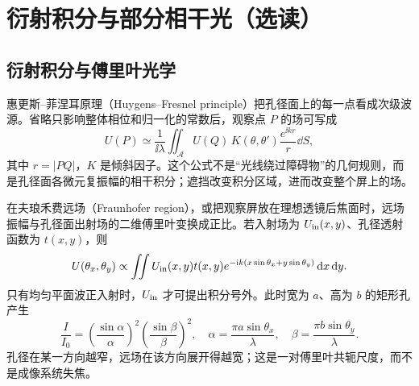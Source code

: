 \section{衍射积分与部分相干光（选读）}

\subsection{衍射积分与傅里叶光学}


惠更斯--菲涅耳原理（Huygens--Fresnel principle）把孔径面上的每一点看成次级波源。省略只影响整体相位和归一化的常数后，观察点 $P$ 的场可写成
\begin{equation}
 U(P)\simeq\frac1{\ii\lambda}\iint_{\mathcal A}
 U(Q)\,K(\theta,\theta')\frac{e^{\ii k r}}r\dd S,
\end{equation}
其中 $r=|PQ|$，$K$ 是倾斜因子。这个公式不是“光线绕过障碍物”的几何规则，而是孔径面各微元复振幅的相干积分；遮挡改变积分区域，进而改变整个屏上的场。

在夫琅禾费远场（Fraunhofer region），或把观察屏放在理想透镜后焦面时，远场振幅与孔径面出射场的二维傅里叶变换成正比。若入射场为 $U_{\rm in}(x,y)$、孔径透射函数为 $t(x,y)$，则
\begin{equation}
 U(\theta_x,\theta_y)\propto
 \iint U_{\rm in}(x,y)t(x,y)e^{-\mathrm i k(x\sin\theta_x+y\sin\theta_y)}\mathop{}\!\mathrm d x\mathop{}\!\mathrm d y.
\end{equation}
只有均匀平面波正入射时，$U_{\rm in}$ 才可提出积分号外。此时宽为 $a$、高为 $b$ 的矩形孔产生
\begin{equation}
 \frac I{I_0}=
 \left(\frac{\sin\alpha}{\alpha}\right)^2
 \left(\frac{\sin\beta}{\beta}\right)^2,
 \quad
 \alpha=\frac{\pi a\sin\theta_x}{\lambda},
 \quad
 \beta=\frac{\pi b\sin\theta_y}{\lambda}.
\end{equation}
孔径在某一方向越窄，远场在该方向展开得越宽；这是一对傅里叶共轭尺度，而不是成像系统失焦。

